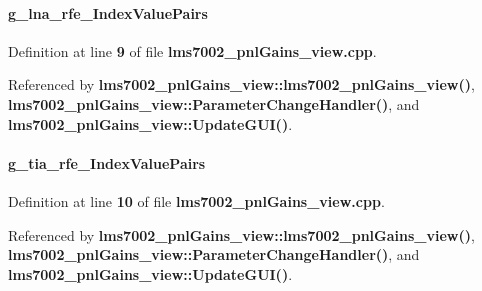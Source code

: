 \paragraph[{g\+\_\+lna\+\_\+rfe\+\_\+\+Index\+Value\+Pairs}]{ g\+\_\+lna\+\_\+rfe\+\_\+\+Index\+Value\+Pairs\hspace{0.3cm}{\ttfamily [static]}}\label{lms7002__pnlGains__view_8cpp_a0c9f6ad2fd1ad70f13af1c49d8d24ac0}


Definition at line {\bf 9} of file {\bf lms7002\+\_\+pnl\+Gains\+\_\+view.\+cpp}.



Referenced by {\bf lms7002\+\_\+pnl\+Gains\+\_\+view\+::lms7002\+\_\+pnl\+Gains\+\_\+view()}, {\bf lms7002\+\_\+pnl\+Gains\+\_\+view\+::\+Parameter\+Change\+Handler()}, and {\bf lms7002\+\_\+pnl\+Gains\+\_\+view\+::\+Update\+G\+U\+I()}.

\paragraph[{g\+\_\+tia\+\_\+rfe\+\_\+\+Index\+Value\+Pairs}]{ g\+\_\+tia\+\_\+rfe\+\_\+\+Index\+Value\+Pairs\hspace{0.3cm}{\ttfamily [static]}}\label{lms7002__pnlGains__view_8cpp_a663423c9d9bbf3ef77cba7cbb4972fad}


Definition at line {\bf 10} of file {\bf lms7002\+\_\+pnl\+Gains\+\_\+view.\+cpp}.



Referenced by {\bf lms7002\+\_\+pnl\+Gains\+\_\+view\+::lms7002\+\_\+pnl\+Gains\+\_\+view()}, {\bf lms7002\+\_\+pnl\+Gains\+\_\+view\+::\+Parameter\+Change\+Handler()}, and {\bf lms7002\+\_\+pnl\+Gains\+\_\+view\+::\+Update\+G\+U\+I()}.

